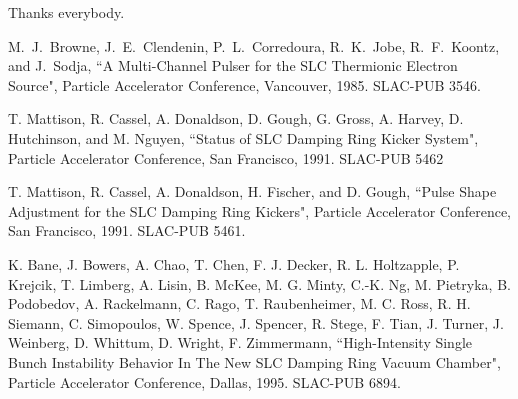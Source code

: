 \documentclass[aps,prl,preprint,groupedaddress]{revtex4-1}
\begin{document}

\begin{acknowledgments}
Thanks everybody.
\end{acknowledgments}

\begin{thebibliography}{9}

 
  M.~J.~Browne, J.~E.~Clendenin, P.~L.~Corredoura, R.~K.~Jobe, R.~F.~Koontz, and J.~Sodja, 
  ``A Multi-Channel Pulser for the SLC Thermionic Electron Source", 
  Particle Accelerator Conference, Vancouver, 1985. 
  SLAC-PUB 3546.
  
  T. Mattison, R. Cassel, A. Donaldson, D. Gough, G. Gross, A. Harvey, D. Hutchinson, and M. Nguyen,
  ``Status of SLC Damping Ring Kicker System",
  Particle Accelerator Conference, San Francisco, 1991.
  SLAC-PUB 5462
  
  T. Mattison, R. Cassel, A. Donaldson, H. Fischer, and D. Gough,
  ``Pulse Shape Adjustment for the SLC Damping Ring Kickers",
  Particle Accelerator Conference, San Francisco, 1991.
  SLAC-PUB 5461.
  
  K. Bane, J. Bowers, A. Chao, T. Chen, F. J. Decker, R. L. Holtzapple, P. Krejcik, T. Limberg, A. Lisin, B. McKee, M. G. Minty, C.-K. Ng, M. Pietryka, B. Podobedov, A. Rackelmann, C. Rago, T. Raubenheimer, M. C. Ross, R. H. Siemann, C. Simopoulos, W. Spence, J. Spencer, R. Stege, F. Tian, J. Turner, J. Weinberg, D. Whittum, D. Wright, F. Zimmermann,
  ``High-Intensity Single Bunch Instability Behavior In The New SLC Damping Ring Vacuum Chamber",
  Particle Accelerator Conference, Dallas, 1995.
  SLAC-PUB 6894.
    
\end{thebibliography}
\end{document}
